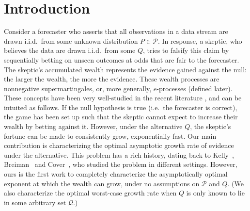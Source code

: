 \documentclass[11pt]{article}
\newcommand{\Pcal}{\mathcal{P}}
\newcommand{\Qcal}{\mathcal{Q}}
\theoremstyle{definition}
\theoremstyle{definition}
\begin{document}

\section{Introduction}
Consider a forecaster who asserts that all observations in a data stream are drawn i.i.d.\ from some unknown distribution $P\in\Pcal$. In response, a skeptic, who believes the data are drawn i.i.d.\ from some $Q$, tries to falsify this claim by sequentially betting on unseen outcomes at odds that are fair to the forecaster. The skeptic's accumulated wealth represents the evidence gained against the null: the larger the wealth, the more the evidence. These wealth processes are nonnegative supermartingales, or, more generally, $e$-processes (defined later). These concepts have been very well-studied in the recent literature \parencite{10.1111/rssa.12647,ramdas2023,grunwald2024,ramdas2022testing}, and can be intuited as follows. If the null hypothesis is true (i.e.\ the forecaster is correct), the game has been set up such that the skeptic cannot expect to increase their wealth by betting against it. However, under the alternative $Q$, the skeptic's fortune can be made to consistently grow, exponentially fast.
Our main contribution is characterizing the optimal asymptotic growth rate of evidence under the alternative. 
This problem has a rich history, dating back to Kelly~\cite{kellyinterpretation}, Breiman~\cite{breiman1961optimal} and Cover~\cite{cover1987log}, who studied the problem in different settings. However, ours is the first work to completely characterize the asymptotically optimal exponent at which the wealth can grow, under no assumptions on $\Pcal$ and $Q$. (We also characterize the optimal worst-case growth rate when $Q$ is only known to lie in some arbitrary set $\Qcal$.) 
\end{document}
